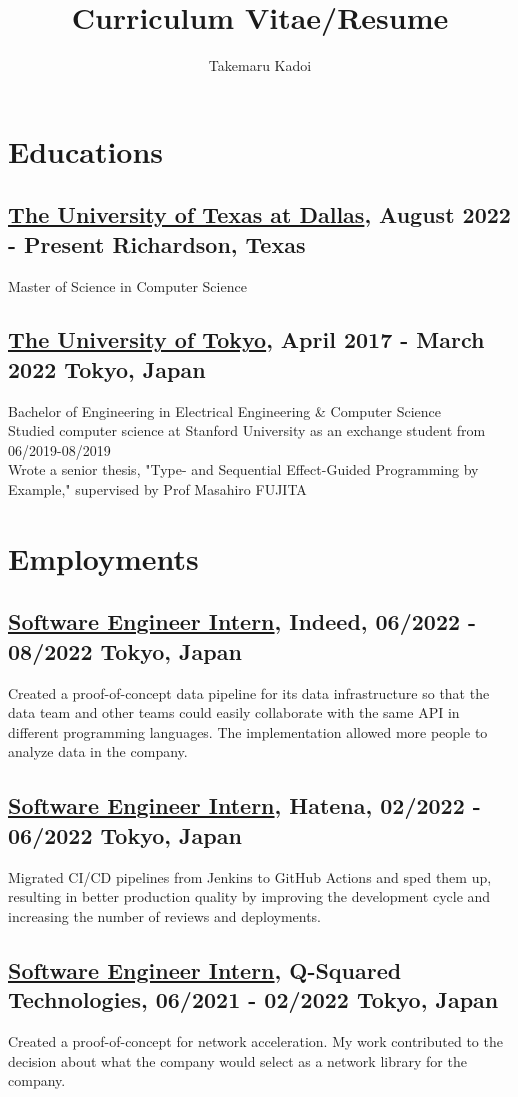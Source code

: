 \documentclass[10pt]{article}
\title{\vspace{-1cm}Curriculum Vitae/Resume}
\author{Takemaru Kadoi}
\date{}
\begin{document}
\section*{Educations}
  \subsection*{\underline{The University of Texas at Dallas}, August 2022 - Present \hfill Richardson, Texas}
    Master of Science in Computer Science
  \subsection*{\underline{The University of Tokyo}, April 2017 - March 2022 \hfill Tokyo, Japan}
    Bachelor of Engineering in Electrical Engineering \& Computer Science
    \\
    Studied computer science at Stanford University as an exchange student from 06/2019-08/2019
    \\
    Wrote a senior thesis, "Type- and Sequential Effect-Guided Programming by Example," supervised by Prof Masahiro FUJITA

\section*{Employments}
  \subsection*{\underline{Software Engineer Intern}, Indeed, 06/2022 - 08/2022 \hfill Tokyo, Japan}
    Created a proof-of-concept data pipeline for its data infrastructure so that the data team and other teams could easily collaborate with the same API in different programming languages.
    The implementation allowed more people to analyze data in the company.
  \subsection*{\underline{Software Engineer Intern}, Hatena, 02/2022 - 06/2022 \hfill Tokyo, Japan}
    Migrated CI/CD pipelines from Jenkins to GitHub Actions and sped them up, resulting in better production quality by improving the development cycle and increasing the number of reviews and deployments.
  \subsection*{\underline{Software Engineer Intern}, Q-Squared Technologies, 06/2021 - 02/2022 \hfill Tokyo, Japan}
    Created a proof-of-concept for network acceleration.
    My work contributed to the decision about what the company would select as a network library for the company.
\end{document}
